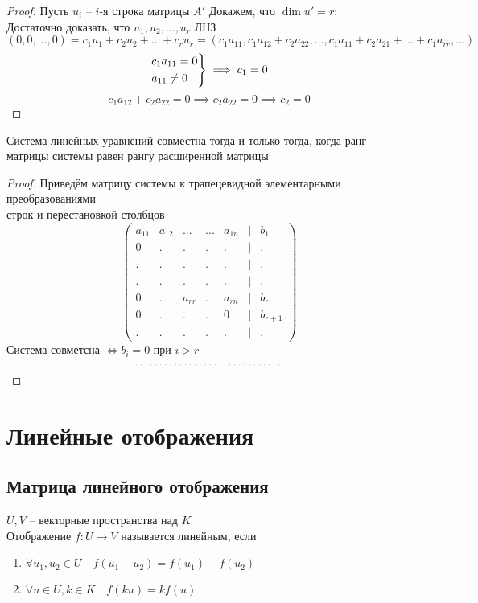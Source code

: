 \begin{proof}
    Пусть $ u_i $ -- $i$-я строка матрицы $ A' $
    Докажем, что $ \dim u' = r $: \\
    Достаточно доказать, что $ u_1, u_2, ..., u_r $ ЛНЗ
    $$ (0, 0, ..., 0) = c_1u_1 + c_2u_2 + ... + c_ru_r = (c_1a_{11}, c_1a_{12} + c_2a_{22}, ..., c_1a_{11} + c_2a_{21} + ... + c_1a_{rr}, ...) $$
    $$
    \begin{rcases}
        c_1a_{11} = 0 \\
        a_{11} \ne 0
    \end{rcases} \implies c_1 = 0 $$
    $$ c_1a_{12} + c_2a_{22} = 0 \implies c_2a_{22} = 0 \implies c_2 = 0 $$
\end{proof}

\begin{theorem}
	Система линейных уравнений совместна тогда и только тогда, когда ранг матрицы системы равен рангу расширенной матрицы
\end{theorem}

\begin{proof}
	Приведём матрицу системы к трапецевидной элементарными преобразованиями \\
    строк и перестановкой столбцов
    $$
    \begin{pmatrix}
        a_{11} & a_{12} & ... & ... & a_{1n} & | & b_1 \\
        0 & . & . & . & . & | & . \\
        . & . & . & . & . & | & . \\
        . & . & . & . & . & | & . \\
        0 & . & a_{rr} & . & a_{rn} & | & b_r \\
        0 & . & . & . & 0 & | & b_{r + 1} \\
        . & . & . & . & . & | & .
    \end{pmatrix} $$
    Система совметсна $ \iff b_i = 0 $ при $ i > r $
    $$ \widedots $$
\end{proof}

\chapter{Линейные отображения}

\section{Матрица линейного отображения}

\begin{definition}
	$ U, V $ -- векторные пространства над $ K $ \\
    Отображение $ f : U \to V $ называется линейным, если
    \begin{enumerate}
    	\item $ \forall u_1, u_2 \in U \quad f(u_1 + u_2) = f(u_1) + f(u_2) $
        \item $ \forall u \in U, k \in K \quad f(ku) = kf(u) $
    \end{enumerate}
\end{definition}

